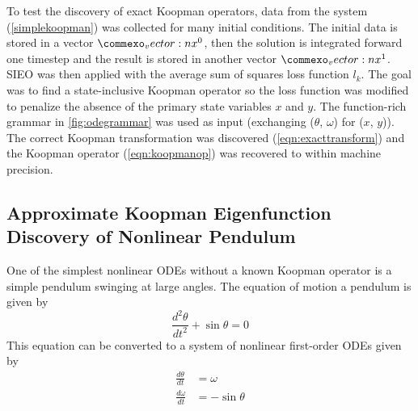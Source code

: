 \documentclass{article}
\renewcommand{\vec}[1]{\vect{#1}}
\begin{document}
To test the discovery of exact Koopman operators, data from the system (\cref{simplekoopman}) was collected for many initial conditions. The initial data is stored in a vector $\vec{x}^0$, then the solution is integrated forward one timestep and the result is stored in another vector $\vec{x}^1$. SIEO was then applied with the average sum of squares loss function $l_k$. The goal was to find a state-inclusive Koopman operator so the loss function was modified to penalize the absence of the primary state variables $x$ and $y$. The function-rich grammar in \cref{fig:odegrammar} was used as input (exchanging ($\theta$, $\omega$) for ($x$, $y$)). The correct Koopman transformation was discovered (\cref{eqn:exacttransform}) and the Koopman operator (\cref{eqn:koopmanop}) was recovered to within machine precision.


\subsection{Approximate Koopman Eigenfunction Discovery of Nonlinear Pendulum}
One of the simplest nonlinear ODEs without a known Koopman operator is a simple pendulum swinging at large angles. The equation of motion a pendulum is given by
\begin{equation}
\frac{d^2 \theta}{d t^2} + \sin \theta = 0 \end{equation}
This equation can be converted to a system of nonlinear first-order ODEs given by
\begin{align}
\frac{d\theta}{dt} &= \omega \\
\frac{d\omega}{dt} &= -\sin \theta
\end{align}
\end{document}
